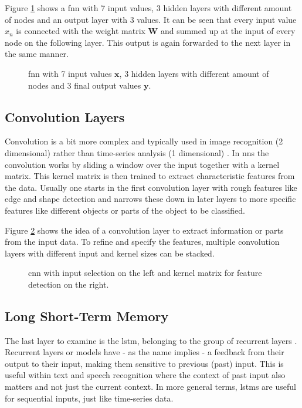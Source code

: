	Figure \ref{f:fnn_example} shows a \ac{fnn} with 7 input values, 3 hidden layers with different amount of nodes and an output layer with 3 values. It can be seen that every input value $x_n$ is connected with the weight matrix $\mathbf{W}$ and summed up at the input of every node on the following layer. This output is again forwarded to the next layer in the same manner.
	
	\begin{figure}[htb]
	\centering
	
	\caption{\acf{fnn} with 7 input values $\mathbf{x}$, 3 hidden layers with different amount of nodes and 3 final output values $\mathbf{y}$.}
	\label{f:fnn_example}
	\end{figure}
	
	\subsection{Convolution Layers}
	Convolution is a bit more complex and typically used in image recognition (2 dimensional) rather than time-series analysis (1 dimensional) \cite[p. 321f]{deep-learning}. \newline
	In \acp{nn} the convolution works by sliding a window over the input together with a kernel matrix. This kernel matrix is then trained to extract characteristic features from the data. Usually one starts in the first convolution layer with rough features like edge and shape detection and narrows these down in later layers to more specific features like different objects or parts of the object to be classified.
	
	Figure \ref{f:cnn_example} shows the idea of a convolution layer to extract information or parts from the input data. To refine and specify the features, multiple convolution layers with different input and kernel sizes can be stacked.

	\begin{figure}[htb]
	\centering
	
	\caption{\acf{cnn} with input selection on the left and kernel matrix for feature detection on the right.}
	\label{f:cnn_example}
	\end{figure}
	
	\subsection{Long Short-Term Memory}
	The last layer to examine is the \ac{lstm}, belonging to the group of recurrent layers \cite[p. 363f]{deep-learning} \cite{lstm}. \newline
	Recurrent layers or models have - as the name implies - a feedback from their output to their input, making them sensitive to previous (past) input. This is useful within text and speech recognition where the context of past input also matters and not just the current context. In more general terms, \acp{lstm} are useful for sequential inputs, just like time-series data.
	
